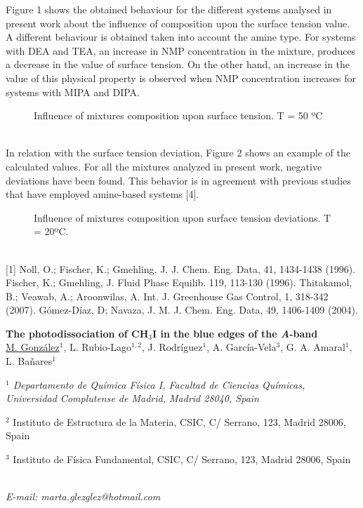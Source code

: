 Figure 1 shows the obtained behaviour for the different systems analysed in
present work about the influence of composition upon the surface tension value. A
different behaviour is obtained taken into account the amine type. For systems with
DEA and TEA, an increase in NMP concentration in the mixture, produces a
decrease in the value of surface tension. On the other hand, an increase in the value
of this physical property is observed when NMP concentration increases for systems
with MIPA and DIPA.
\newpage
\begin{figure}[h]
 \centerline{}
 \caption[]{ Influence of mixtures composition upon surface tension. T = 50 ºC}\label{figure 1}
\end{figure}
\\
In relation with the surface tension deviation, Figure 2 shows an example of
the calculated values. For all the mixtures analyzed in present work, negative
deviations have been found. This behavior is in agreement with previous studies that
have employed amine-based systems [4].
\\
\begin{figure}[h]
 \centerline{}
 \caption[]{Influence of mixtures composition upon surface tension deviations. T = 20ºC.}\label{figure 1}
\end{figure}
\\
{\footnotesize
[1] Noll, O.; Fischer, K.; Gmehling, J. J. Chem. Eng. Data, 41, 1434-1438 (1996).
\newline
[2] Fischer, K.; Gmehling, J. Fluid Phase Equilib. 119, 113-130 (1996).
\newline
[3] Thitakamol, B.; Veawab, A.; Aroonwilas, A. Int. J. Greenhouse Gas Control, 1, 318-342 (2007).
\newline
[4] Gómez-Díaz, D; Navaza, J. M. J. Chem. Eng. Data, 49, 1406-1409 (2004).
}
\newpage
\setcounter{figure}{0}
\begin{center}
{\bf \Large
The photodissociation of CH$_3$I in the blue edges of the \textit{A}-band
}
\\
\vspace{0.5cm}
\underline{M. González}$^{1}$, L. Rubio-Lago$^{1,2}$, J. Rodríguez$^{1}$, A. García-Vela$^{3}$, G. A. Amaral$^{1}$,
L. Bañares$^{1}$
\\
\vspace{0.5cm}
{\it 
$^{1}$ Departamento de Química Física I, Facultad de Ciencias Químicas, Universidad Complutense de
Madrid, Madrid 28040, Spain

$^{2}$ Instituto de Estructura de la Materia, CSIC, C/ Serrano, 123, Madrid 28006, Spain

$^{3}$ Instituto de Física Fundamental, CSIC, C/ Serrano, 123, Madrid 28006, Spain
}
\\
\vspace{0.5cm}
{\it E-mail: marta.glezglez@hotmail.com}
\\
\vspace{0.5cm}
\end{center}
